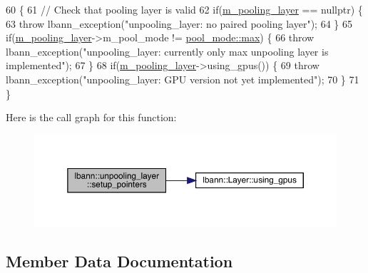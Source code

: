 \begin{DoxyCode}
60                                  \{
61     \textcolor{comment}{// Check that pooling layer is valid}
62     \textcolor{keywordflow}{if}(\hyperlink{classlbann_1_1unpooling__layer_ab15a8b0680685f80c7d995e617e97a9a}{m\_pooling\_layer} == \textcolor{keyword}{nullptr}) \{
63       \textcolor{keywordflow}{throw} lbann\_exception(\textcolor{stringliteral}{"unpooling\_layer: no paired pooling layer"});
64     \}
65     \textcolor{keywordflow}{if}(\hyperlink{classlbann_1_1unpooling__layer_ab15a8b0680685f80c7d995e617e97a9a}{m\_pooling\_layer}->m\_pool\_mode != \hyperlink{base_8hpp_ac47a6ee5278a53898222a48639a2bf39a2ffe4e77325d9a7152f7086ea7aa5114}{pool\_mode::max}) \{
66       \textcolor{keywordflow}{throw} lbann\_exception(\textcolor{stringliteral}{"unpooling\_layer: currently only max unpooling layer is implemented"});
67     \}
68     \textcolor{keywordflow}{if}(\hyperlink{classlbann_1_1unpooling__layer_ab15a8b0680685f80c7d995e617e97a9a}{m\_pooling\_layer}->using\_gpus()) \{
69       \textcolor{keywordflow}{throw} lbann\_exception(\textcolor{stringliteral}{"unpooling\_layer: GPU version not yet implemented"});
70     \}
71   \}
\end{DoxyCode}
Here is the call graph for this function\+:\nopagebreak
\begin{figure}[H]
\begin{center}
\leavevmode
\includegraphics[width=350pt]{classlbann_1_1unpooling__layer_a32da9e26ce50aa3df3ecc52691bd5e4f_cgraph}
\end{center}
\end{figure}


\subsection{Member Data Documentation}
\mbox{\label{classlbann_1_1unpooling__layer_ab15a8b0680685f80c7d995e617e97a9a}} 
